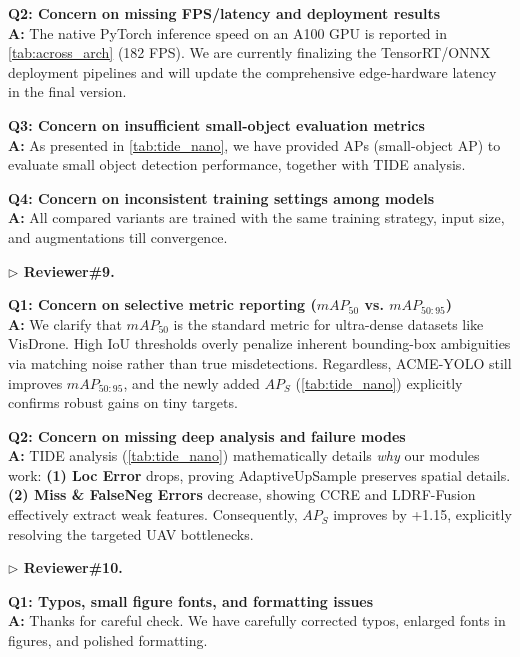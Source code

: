 \documentclass[10pt,twocolumn,letterpaper]{article}
\begin{document}
\noindent\textbf{Q2: Concern on missing FPS/latency and deployment results}\\
\noindent\textbf{A:} The native PyTorch inference speed on an A100 GPU is reported in \cref{tab:across_arch} (182 FPS). We are currently finalizing the TensorRT/ONNX deployment pipelines and will update the comprehensive edge-hardware latency in the final version.

\noindent\textbf{Q3: Concern on insufficient small-object evaluation metrics}\\
\noindent\textbf{A:} As presented in \cref{tab:tide_nano}, we have provided APs (small-object AP) to evaluate small object detection performance, together with TIDE analysis.

\noindent\textbf{Q4: Concern on inconsistent training settings among models}\\
\noindent\textbf{A:}  All compared variants are trained with the same training strategy, input size, and augmentations till convergence.

\vspace{0.5em}

\noindent\textcolor{rev9color}{\textbf{$\triangleright$ Reviewer\#9.}}

\noindent\textbf{Q1: Concern on selective metric reporting ($mAP_{50}$ vs. $mAP_{50:95}$)}\\
\noindent\textbf{A:} We clarify that $mAP_{50}$ is the standard metric for ultra-dense datasets like VisDrone. High IoU thresholds overly penalize inherent bounding-box ambiguities via matching noise rather than true misdetections. Regardless, ACME-YOLO still improves $mAP_{50:95}$, and the newly added $AP_S$ (\cref{tab:tide_nano}) explicitly confirms robust gains on tiny targets.

\noindent\textbf{Q2: Concern on missing deep analysis and failure modes}\\
\noindent\textbf{A:}  TIDE analysis (\cref{tab:tide_nano}) mathematically details \textit{why} our modules work:
\textbf{(1) Loc Error} drops, proving AdaptiveUpSample preserves spatial details.
\textbf{(2) Miss \& FalseNeg Errors} decrease, showing CCRE and LDRF-Fusion effectively extract weak features.
Consequently, $AP_S$ improves by +1.15, explicitly resolving the targeted UAV bottlenecks.
\vspace{0.5em}

\noindent\textcolor{rev10color}{\textbf{$\triangleright$ Reviewer\#10.}}

\noindent\textbf{Q1: Typos, small figure fonts, and formatting issues}\\
\noindent\textbf{A:} Thanks for careful check. We have carefully corrected typos, enlarged fonts in figures, and polished formatting.
\end{document}
